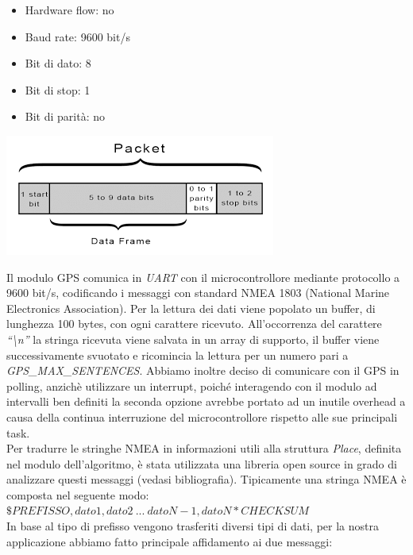\begin{itemize}
\item
  
  Hardware flow: no
  
\item
  
  Baud rate: 9600 bit/s
  
\item
  
  Bit di dato: 8
  
\item
  
  Bit di stop: 1
  
\item
  
  Bit di parità: no
  
\end{itemize}

\begin{center}
\includegraphics[width=3.5in,height=1.5625in]{figures/image46.png}
\captionsetup{type=figure}
\end{center}

\noindent Il modulo GPS comunica in \emph{UART} con il microcontrollore mediante
protocollo a 9600 bit/s, codificando i messaggi con standard NMEA 1803
(National Marine Electronics Association). Per la lettura dei dati viene
popolato un buffer, di lunghezza 100 bytes, con ogni carattere ricevuto.
All'occorrenza del carattere \emph{``\textbackslash n''} la stringa
ricevuta viene salvata in un array di supporto, il buffer viene
successivamente svuotato e ricomincia la lettura per un numero pari a
\emph{GPS\_MAX\_SENTENCES}. Abbiamo inoltre deciso di comunicare con il
GPS in polling, anzichè utilizzare un interrupt, poiché interagendo con
il modulo ad intervalli ben definiti la seconda opzione avrebbe portato
ad un inutile overhead a causa della continua interruzione del
microcontrollore rispetto alle sue principali task.\\
Per tradurre le stringhe NMEA in informazioni utili alla struttura
\emph{Place}, definita nel modulo dell'algoritmo, è stata utilizzata una
libreria open source in grado di analizzare questi messaggi (vedasi
bibliografia). Tipicamente una stringa NMEA è composta nel seguente
modo:\\
\(\$ PREFISSO,dato1,dato2\ ...\ datoN - 1,datoN*CHECKSUM\)\\
In base al tipo di prefisso vengono trasferiti diversi tipi di dati, per
la nostra applicazione abbiamo fatto principale affidamento ai due
messaggi:

